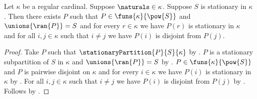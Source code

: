 \begin{corollary}\label{solovay_stationary_splitting_expanded}
    Let $\kappa$ be a regular cardinal.
    Suppose $\naturals\in\kappa$.
    Suppose $S$ is stationary in $\kappa$.
    Then there exists $P$ such that
        $P\in\funs{\kappa}{\pow{S}}$ and
        $\unions{\ran{P}}=S$ and
        for every $r\in\kappa$ we have $P(r)$ is stationary in $\kappa$ and
        for all $i,j\in\kappa$ such that $i\neq j$ we have
            $P(i)$ is disjoint from $P(j)$.
\end{corollary}
\begin{proof}
    Take $P$ such that $\stationaryPartition{P}{S}{\kappa}$
        by .
    $P$ is a stationary subpartition of $S$ in $\kappa$ and
        $\unions{\ran{P}}=S$ by .
    $P\in\funs{\kappa}{\pow{S}}$ and
        $P$ is pairwise disjoint on $\kappa$ and
        for every $i\in\kappa$ we have $P(i)$ is stationary in $\kappa$
        by .
    For all $i,j\in\kappa$ such that $i\neq j$ we have
        $P(i)$ is disjoint from $P(j)$
        by .
    Follows by \auto.
\end{proof}
